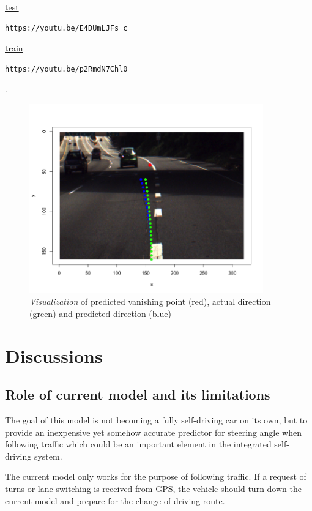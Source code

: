 \documentclass[11pt, oneside]{article}
\begin{document}
\href{https://youtu.be/E4DUmLJFs_c}{test}
\begin{verbatim}
https://youtu.be/E4DUmLJFs_c
\end{verbatim}

\href{https://youtu.be/p2RmdN7Chl0}{train}
\begin{verbatim}
https://youtu.be/p2RmdN7Chl0
\end{verbatim}
. 

\begin{figure}[!ht]
  \centering
      \includegraphics[width=0.9\textwidth]{Rplot3.png} 
  \caption{\textit{Visualization} of predicted vanishing point (red), actual direction (green) and predicted direction (blue)}
\end{figure}


\section*{Discussions}


\subsection*{Role of current model and its limitations}

The goal of this model is not becoming a fully self-driving car on its own, but to provide an inexpensive yet somehow accurate predictor for steering angle when following traffic which could be an important element in the integrated self-driving system. 

The current model only works for the purpose of following traffic. If a request of turns or lane switching is received from GPS, the vehicle should turn down the current model and prepare for the change of driving route. 
\end{document}
